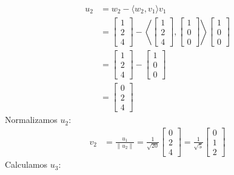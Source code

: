 \documentclass[11pt,letterpaper]{article}
\begin{document}
\begin{align*}
    u_2&=w_2-\langle w_2,v_1 \rangle v_1\\
    &=\begin{bmatrix} 1\\2\\4 \end{bmatrix}-\left\langle \begin{bmatrix} 1\\2\\4 \end{bmatrix},\begin{bmatrix} 1\\0\\0 \end{bmatrix} \right\rangle \begin{bmatrix} 1\\0\\0 \end{bmatrix}\\
    &=\begin{bmatrix} 1\\2\\4 \end{bmatrix}-\begin{bmatrix} 1\\0\\0 \end{bmatrix}\\
    &=\begin{bmatrix} 0\\2\\4 \end{bmatrix}
\end{align*}
Normalizamos $u_2$:
\begin{align*}
v_2&=\frac{u_1}{\|u_2\|}=\frac{1}{\sqrt{20}}\begin{bmatrix} 0\\2\\4 \end{bmatrix}=\frac{1}{\sqrt{5}}\begin{bmatrix} 0\\1\\2 \end{bmatrix}
\end{align*}
Calculamos $u_3$:
\end{document}

